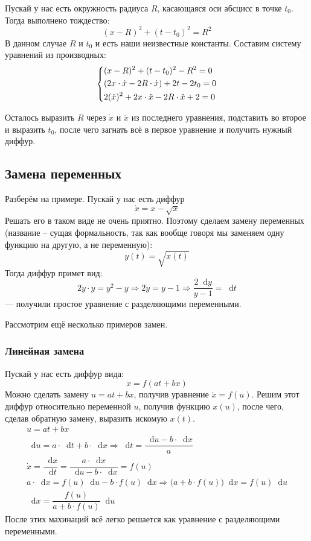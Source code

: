 \documentclass[a4paper,12pt]{article}
\renewcommand*\d{\mathop{}\!\mathrm{d}}
\newcommand{\dx}{\dot{x}}
\newcommand{\ddx}{\ddot{x}}
\begin{document}
Пускай у нас есть окружность радиуса $R$, касающаяся оси абсцисс в точке $t_0$. Тогда выполнено тождество:
\[(x - R)^2 + (t - t_0)^2 = R^2\]
В данном случае $R$ и $t_0$ и есть наши неизвестные константы. Составим систему уравнений из производных:
\[\left\{\begin{gathered}
(x - R)^2 + (t - t_0)^2 - R^2 = 0\hfill\\
(2x\cdot \dx - 2R \cdot \dx) + 2t - 2t_0 = 0\hfill\\
2(\dx)^2 + 2x\cdot \ddx - 2R \cdot \ddx + 2 = 0\hfill
\end{gathered}\right.\]

Осталось выразить $R$ через $\dx$ и $\ddx$ из последнего уравнения, подставить во второе и выразить $t_0$, после чего загнать всё в первое уравнение и получить нужный диффур. 

\subsection{Замена переменных}

Разберём на примере. Пускай у нас есть диффур \[\dot{x} = x - \sqrt{x}\] Решать его в таком виде не очень приятно. Поэтому сделаем замену переменных (название -- сущая формальность, так как вообще говоря мы заменяем одну функцию на другую, а не переменную): \[y(t) = \sqrt{x(t)}\] Тогда диффур примет вид:
\[2\dot{y}\cdot y = y^2 - y \Longrightarrow 2\dot{y} = y - 1 \Longrightarrow \dfrac{2\d y}{y - 1} = \d t\] --- получили простое уравнение с разделяющими переменными.

Рассмотрим ещё несколько примеров замен.

\subsubsection{Линейная замена}

Пускай у нас есть диффур вида:
\[\dx = f(at + bx)\]
Можно сделать замену $u = at + bx$, получив уравнение $\dx = f(u)$. Решим этот диффур относительно переменной $u$, получив функцию $x(u)$, после чего, сделав обратную замену, выразить искомую $x(t)$.
\begin{gather*}
	u = at + bx                                                                                        \\
	\d u = a\cdot \d t + b \cdot \d x \Longrightarrow \d t = \dfrac{\d u - b\cdot \d x}{a}             \\
	\dx = \dfrac{\d x}{\d t} = \dfrac{a \cdot \d x}{\d u - b \cdot \d x} = f(u)                        \\
	a \cdot \d x = f(u)\d u - b\cdot f(u)\d x \Longrightarrow \big(a + b\cdot f(u)\big)\d x = f(u)\d u \\
	\d x = \dfrac{f(u)}{a + b \cdot f(u)} \d u
\end{gather*}
После этих махинаций всё легко решается как уравнение с разделяющими переменными.
\ \\
\end{document}

